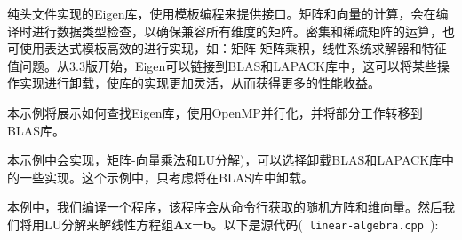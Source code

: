 纯头文件实现的Eigen库，使用模板编程来提供接口。矩阵和向量的计算，会在编译时进行数据类型检查，以确保兼容所有维度的矩阵。密集和稀疏矩阵的运算，也可使用表达式模板高效的进行实现，如：矩阵-矩阵乘积，线性系统求解器和特征值问题。从3.3版开始，Eigen可以链接到BLAS和LAPACK库中，这可以将某些操作实现进行卸载，使库的实现更加灵活，从而获得更多的性能收益。

本示例将展示如何查找Eigen库，使用OpenMP并行化，并将部分工作转移到BLAS库。

本示例中会实现，矩阵-向量乘法和\href{[https://zh.wikipedia.org/wiki/LU\%E5\%88\%86\%E8\%A7\%A3](https://zh.wikipedia.org/wiki/LU分解}{LU分解})，可以选择卸载BLAS和LAPACK库中的一些实现。这个示例中，只考虑将在BLAS库中卸载。


本例中，我们编译一个程序，该程序会从命令行获取的随机方阵和维向量。然后我们将用LU分解来解线性方程组\textbf{Ax=b}。以下是源代码(\texttt{ linear-algebra.cpp }):

